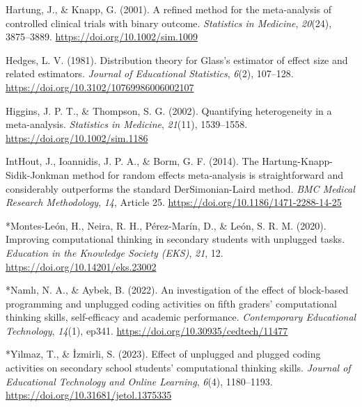 \documentclass[man,a4paper,12pt,floatsintext,nolmodern,notab]{apa7}
\begin{document}
\par\noindent\hangindent=0.5in Hartung, J., \& Knapp, G. (2001). A refined method for the meta-analysis of controlled clinical trials with binary outcome. \textit{Statistics in Medicine}, \textit{20}(24), 3875–3889. \url{https://doi.org/10.1002/sim.1009}\par
\par\noindent\hangindent=0.5in Hedges, L. V. (1981). Distribution theory for Glass's estimator of effect size and related estimators. \textit{Journal of Educational Statistics}, \textit{6}(2), 107–128. \url{https://doi.org/10.3102/10769986006002107}\par
\par\noindent\hangindent=0.5in Higgins, J. P. T., \& Thompson, S. G. (2002). Quantifying heterogeneity in a meta-analysis. \textit{Statistics in Medicine}, \textit{21}(11), 1539–1558. \url{https://doi.org/10.1002/sim.1186}\par
\par\noindent\hangindent=0.5in IntHout, J., Ioannidis, J. P. A., \& Borm, G. F. (2014). The Hartung-Knapp-Sidik-Jonkman method for random effects meta-analysis is straightforward and considerably outperforms the standard DerSimonian-Laird method. \textit{BMC Medical Research Methodology}, \textit{14}, Article 25. \url{https://doi.org/10.1186/1471-2288-14-25}\par
\par\noindent\hangindent=0.5in *Montes-León, H., Neira, R. H., Pérez-Marín, D., \& León, S. R. M. (2020). Improving computational thinking in secondary students with unplugged tasks. \textit{Education in the Knowledge Society (EKS)}, \textit{21}, 12. \url{https://doi.org/10.14201/eks.23002}\par
\par\noindent\hangindent=0.5in *Namlı, N. A., \& Aybek, B. (2022). An investigation of the effect of block-based programming and unplugged coding activities on fifth graders’ computational thinking skills, self-efficacy and academic performance. \textit{Contemporary Educational Technology}, \textit{14}(1), ep341. \url{https://doi.org/10.30935/cedtech/11477}\par
\par\noindent\hangindent=0.5in *Yilmaz, T., \& İzmirli, S. (2023). Effect of unplugged and plugged coding activities on secondary school students’ computational thinking skills. \textit{Journal of Educational Technology and Online Learning}, \textit{6}(4), 1180–1193. \url{https://doi.org/10.31681/jetol.1375335}\par
\end{document}
